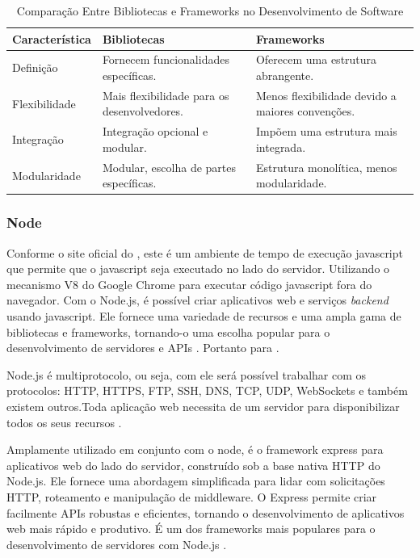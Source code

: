 \begin{table}[h]
    \centering
    \begin{tabularx}{\textwidth}{X X X}
      \toprule
      \textbf{Característica} & \textbf{Bibliotecas} & \textbf{Frameworks} \\
      \midrule
      Definição & Fornecem funcionalidades específicas. & Oferecem uma estrutura abrangente. \\
      \midrule
      Flexibilidade & Mais flexibilidade para os desenvolvedores. & Menos flexibilidade devido a maiores convenções. \\
      \midrule
      Integração & Integração opcional e modular. & Impõem uma estrutura mais integrada. \\
      \midrule
      Modularidade & Modular, escolha de partes específicas. & Estrutura monolítica, menos modularidade. \\
      \bottomrule
    \end{tabularx}
    \caption{Comparação Entre Bibliotecas e Frameworks no Desenvolvimento de Software}
    \label{tab:comparacao_bibliotecas_frameworks}
  \end{table}

\subsubsection{Node}
 Conforme o site oficial do , este é um ambiente de tempo de execução javascript que permite que o javascript seja executado no lado do servidor. Utilizando o mecanismo V8 do Google Chrome para executar código javascript fora do navegador.
 Com o Node.js, é possível criar aplicativos web e serviços \textit{backend} usando javascript. Ele fornece uma variedade de recursos e uma ampla gama de bibliotecas e frameworks, tornando-o uma escolha popular para o desenvolvimento de servidores e APIs \cite{Nodejs}.
Portanto para .
    \begin{citacao}
        Node.js é multiprotocolo, ou seja, com ele será possível trabalhar com os protocolos: HTTP, HTTPS, FTP, SSH, DNS, TCP, UDP, WebSockets e também existem outros.Toda aplicação web necessita de um servidor para disponibilizar todos os seus  recursos \cite{pereira2014aplicações}.
    \end{citacao}

Amplamente utilizado em conjunto com o node, é o framework express para aplicativos web do lado do servidor, construído sob a base nativa HTTP do Node.js.
     Ele fornece uma abordagem simplificada para lidar com solicitações HTTP, roteamento e manipulação de middleware. 
	 O Express permite criar facilmente APIs robustas e eficientes, tornando o desenvolvimento de aplicativos web mais rápido e produtivo. É um dos frameworks mais populares para o desenvolvimento de servidores com Node.js
     \cite{pereira2014aplicações}.

